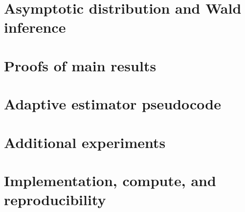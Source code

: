 \documentclass{article}
\theoremstyle{plain}
\theoremstyle{definition}
\theoremstyle{remark}
\newcommand{\1}{\mathbf{1}}
\begin{document}
\section{Asymptotic distribution and Wald inference}


\section{Proofs of main results}


\section{Adaptive estimator pseudocode}


\section{Additional experiments}


\section{Implementation, compute, and reproducibility}

\end{document}
